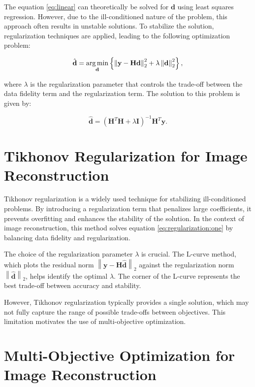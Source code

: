 The equation \ref{eq:linear} can theoretically be solved for \( \mathbf{d} \) using least squares regression. However, due to the ill-conditioned nature of the problem, this approach often results in unstable solutions. To stabilize the solution, regularization techniques are applied, leading to the following optimization problem:

\begin{equation} \label{eq:regularization:one}
    \hat{\mathbf{d}} = \operatorname*{arg\,min}_{\mathbf{d}} \left\{ \left\| \mathbf{y} - \mathbf{H} \mathbf{d} \right\|_2^2 + \lambda \left\| \mathbf{d} \right\|_2^2 \right\},
\end{equation}

where \( \lambda \) is the regularization parameter that controls the trade-off between the data fidelity term and the regularization term. The solution to this problem is given by:

\begin{equation}
    \hat{\mathbf{d}} = \left( \mathbf{H}^T \mathbf{H} + \lambda \mathbf{I} \right)^{-1} \mathbf{H}^T \mathbf{y}.
\end{equation}

\section{Tikhonov Regularization for Image Reconstruction} \label{sec:method:first}

Tikhonov regularization is a widely used technique for stabilizing ill-conditioned problems. By introducing a regularization term that penalizes large coefficients, it prevents overfitting and enhances the stability of the solution. In the context of image reconstruction, this method solves equation \ref{eq:regularization:one} by balancing data fidelity and regularization.

The choice of the regularization parameter \( \lambda \) is crucial. The L-curve method, which plots the residual norm \( \left\| \mathbf{y} - \mathbf{H} \hat{\mathbf{d}} \right\|_2 \) against the regularization norm \( \left\| \hat{\mathbf{d}} \right\|_2 \), helps identify the optimal \( \lambda \). The corner of the L-curve represents the best trade-off between accuracy and stability.

However, Tikhonov regularization typically provides a single solution, which may not fully capture the range of possible trade-offs between objectives. This limitation motivates the use of multi-objective optimization.

\section{Multi-Objective Optimization for Image Reconstruction} \label{sec:method:second}

